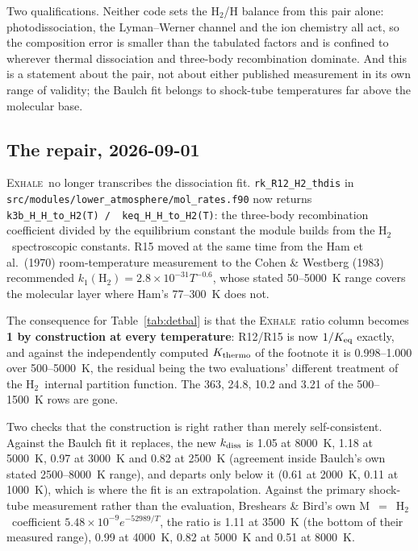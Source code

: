 \documentclass[english,a4paper]{my_memo}
\newcommand{\EXHALE}{\textsc{Exhale}}
\newcommand{\Htwo}{\ensuremath{\mathrm{H}_2}}
\begin{document}
Two qualifications. Neither code sets the \Htwo/H balance from this pair
alone: photodissociation, the Lyman--Werner channel and the ion chemistry all
act, so the composition error is smaller than the tabulated factors and is
confined to wherever thermal dissociation and three-body recombination
dominate. And this is a statement about the pair, not about either published
measurement in its own range of validity; the Baulch fit belongs to
shock-tube temperatures far above the molecular base.

\subsection{The repair, 2026-09-01}
\label{sec:detbalfix}

\EXHALE\ no longer transcribes the dissociation fit.
\texttt{rk\_R12\_H2\_thdis} in
\texttt{src/modules/\allowbreak lower\_atmosphere/\allowbreak mol\_rates.f90}
now returns \texttt{k3b\_H\_H\_to\_H2(T)\allowbreak\ /\ \allowbreak
keq\_H\_H\_to\_H2(T)}: the three-body
recombination coefficient divided by the equilibrium constant the module
builds from the \Htwo\ spectroscopic constants. R15 moved at the same time
from the Ham et al.\ (1970) room-temperature measurement to the Cohen \&
Westberg (1983) recommended $k_1(\Htwo) = 2.8\times10^{-31}T^{-0.6}$, whose
stated 50--5000~K range covers the molecular layer where Ham's 77--300~K does
not.

The consequence for Table~\ref{tab:detbal} is that the \EXHALE\ ratio column
becomes \textbf{1 by construction at every temperature}: R12/R15 is now
$1/K_{\rm eq}$ exactly, and against the independently computed
$K_{\rm thermo}$ of the footnote it is 0.998--1.000 over 500--5000~K, the
residual being the two evaluations' different treatment of the \Htwo\ internal
partition function. The 363, 24.8, 10.2 and 3.21 of the 500--1500~K rows are
gone.

Two checks that the construction is right rather than merely self-consistent.
Against the Baulch fit it replaces, the new $k_{\rm diss}$ is 1.05 at 8000~K,
1.18 at 5000~K, 0.97 at 3000~K and 0.82 at 2500~K (agreement inside
Baulch's own stated 2500--8000~K range), and departs only below it (0.61 at
2000~K, 0.11 at 1000~K), which is where the fit is an extrapolation. Against
the primary shock-tube measurement rather than the evaluation, Breshears \&
Bird's own M~$=$~\Htwo\ coefficient $5.48\times10^{-9}e^{-52989/T}$, the ratio
is 1.11 at 3500~K (the bottom of their measured range), 0.99 at 4000~K, 0.82
at 5000~K and 0.51 at 8000~K.
\end{document}
